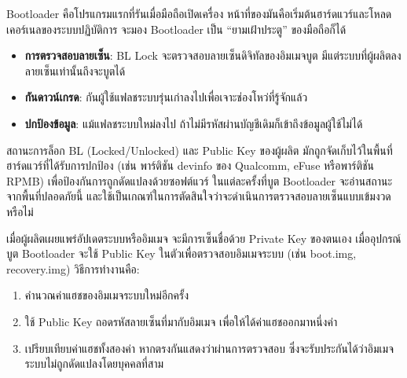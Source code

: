 


Bootloader คือโปรแกรมแรกที่รันเมื่อมือถือเปิดเครื่อง หน้าที่ของมันคือเริ่มต้นฮาร์ดแวร์และโหลดเคอร์เนลของระบบปฏิบัติการ จะมอง Bootloader เป็น “ยามเฝ้าประตู” ของมือถือก็ได้


\begin{itemize}
  \item \textbf{การตรวจสอบลายเซ็น}: BL Lock จะตรวจสอบลายเซ็นดิจิทัลของอิมเมจบูต มีแต่ระบบที่ผู้ผลิตลงลายเซ็นเท่านั้นถึงจะบูตได้
  \item \textbf{กันดาวน์เกรด}: กันผู้ใช้แฟลชระบบรุ่นเก่าลงไปเพื่อเจาะช่องโหว่ที่รู้จักแล้ว
  \item \textbf{ปกป้องข้อมูล}: แม้แฟลชระบบใหม่ลงไป ถ้าไม่มีรหัสผ่านบัญชีเดิมก็เข้าถึงข้อมูลผู้ใช้ไม่ได้
\end{itemize}


สถานะการล็อก BL (Locked/Unlocked) และ Public Key ของผู้ผลิต มักถูกจัดเก็บไว้ในพื้นที่ฮาร์ดแวร์ที่ได้รับการปกป้อง (เช่น พาร์ติชัน devinfo ของ Qualcomm, eFuse หรือพาร์ติชัน RPMB) เพื่อป้องกันการถูกดัดแปลงด้วยซอฟต์แวร์ ในแต่ละครั้งที่บูต Bootloader จะอ่านสถานะจากพื้นที่ปลอดภัยนี้ และใช้เป็นเกณฑ์ในการตัดสินใจว่าจะดำเนินการตรวจสอบลายเซ็นแบบเข้มงวดหรือไม่


เมื่อผู้ผลิตเผยแพร่อัปเดตระบบหรืออิมเมจ จะมีการเซ็นชื่อด้วย Private Key ของตนเอง เมื่ออุปกรณ์บูต Bootloader จะใช้ Public Key ในตัวเพื่อตรวจสอบอิมเมจระบบ (เช่น boot.img, recovery.img) วิธีการทำงานคือ:

\begin{enumerate}
  \item คำนวณค่าแฮชของอิมเมจระบบใหม่อีกครั้ง
  \item ใช้ Public Key ถอดรหัสลายเซ็นที่มากับอิมเมจ เพื่อให้ได้ค่าแฮชออกมาหนึ่งค่า
  \item เปรียบเทียบค่าแฮชทั้งสองค่า หากตรงกันแสดงว่าผ่านการตรวจสอบ ซึ่งจะรับประกันได้ว่าอิมเมจระบบไม่ถูกดัดแปลงโดยบุคคลที่สาม
\end{enumerate}

